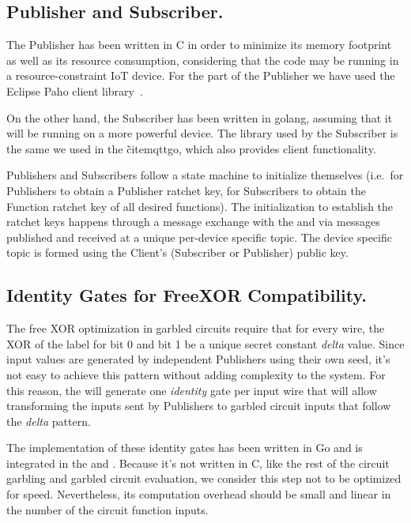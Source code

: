 \subsection{Publisher and Subscriber.}

The Publisher has been written in C in order to minimize its memory footprint
as well as its resource consumption, considering that the code may be running
in a resource-constraint IoT device.  For the \MQTT{} part of the Publisher we
have used the Eclipse Paho client library~\cite{paho}.

On the other hand, the Subscriber has been written in golang, assuming that it
will be running on a more powerful device.  The \MQTT{} library used by the
Subscriber is the same we used in the \broker\~cite{mqttgo}, which also provides
client functionality.

Publishers and Subscribers follow a state machine to initialize themselves
(i.e.\ for Publishers to obtain a Publisher ratchet key, for Subscribers to
obtain the Function ratchet key of all desired functions).  The initialization
to establish the ratchet keys happens through a message exchange with the
\broker and \garbler via \MQTT{} messages published and received at a unique
per-device specific topic.  The device specific topic is formed using the
Client's (Subscriber or Publisher) public key.

\subsection{Identity Gates for FreeXOR Compatibility.}

The free XOR optimization in garbled circuits require that for every wire, the
XOR of the label for bit 0 and bit 1 be a unique secret constant \emph{delta}
value.  Since input values are generated by independent Publishers using their
own seed, it's not easy to achieve this pattern without adding complexity to
the system.  For this reason, the \garbler will generate one \emph{identity}
gate per input wire that will allow transforming the inputs sent by Publishers
to garbled circuit inputs that follow the \emph{delta} pattern.

The implementation of these identity gates has been written in Go and is
integrated in the \broker and \garbler.  Because it's not written in C, like
the rest of the circuit garbling and garbled circuit evaluation, we consider
this step not to be optimized for speed.  Nevertheless, its computation
overhead should be small and linear in the number of the circuit function
inputs.


